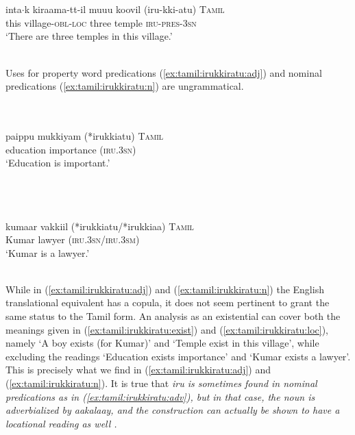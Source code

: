 \documentclass[a4paper,12pt]{article}
\newcommand{\xbox}[2]{\noindent\parbox[t]{#1}{#2}\noindent}
\newcommand{\xref}[1]{(\ref{#1})}
\newcommand{\ea}{\\\\}
\newcommand{\z}{\\\\}
\begin{document}
\xbox{\textwidth}{
\ea\label{ex:tamil:irukkiratu:loc}
\gll inta$\cdot$k\footnotemark{} kiraama-tt-il muu\textipa{\textsubbar{n}}\textipa{\textsubbar{r}}u koovil (iru-kki\textipa{\textsubbar{r}}-atu) \textsc{Tamil} \\
      this village-\textsc{obl}-\textsc{loc} three temple \textsc{iru}-\textsc{pres}-\textsc{3sn} \\
    `There are three temples in this village.' \citep[173]{Lehmann1989tamil}
\z
} 

Uses for property word predications \xref{ex:tamil:irukkiratu:adj} and nominal predications \xref{ex:tamil:irukkiratu:n} are  ungrammatical.


\xbox{\textwidth}{
\ea\label{ex:tamil:irukkiratu:adj}
\gll pa\dott ippu mukkiyam (*irukki\textipa{\textsubbar{r}}atu) \textsc{Tamil} \\
     education importance (\textsc{iru}.\textsc{3sn}) \\
    `Education is important.' \citep[172]{Lehmann1989tamil}
\z
} 


\xbox{\textwidth}{
\ea\label{ex:tamil:irukkiratu:n}
\gll kumaar vakkiil (*irukki\textipa{\textsubbar{r}}atu/*irukki\textipa{\textsubbar{r}}aa\textipa{\textsubbar{n}}) \textsc{Tamil} \\
      Kumar lawyer (\textsc{iru}.\textsc{3sn}/\textsc{iru}.\textsc{3sm})\\
    `Kumar is a lawyer.' \citep[171]{Lehmann1989tamil}
\z
} 

While in \xref{ex:tamil:irukkiratu:adj} and \xref{ex:tamil:irukkiratu:n}  the English translational equivalent has a copula, it does not seem pertinent to grant the same status to the Tamil form. An analysis as an existential can cover both the meanings given in \xref{ex:tamil:irukkiratu:exist} and \xref{ex:tamil:irukkiratu:loc}, namely `A boy exists (for Kumar)' and `Temple exist in this village', while excluding the readings `Education exists importance' and `Kumar exists a lawyer'. This is precisely what we find in \xref{ex:tamil:irukkiratu:adj} and \xref{ex:tamil:irukkiratu:n}. It is true that \em iru \em is sometimes found in nominal predications as in \xref{ex:tamil:irukkiratu:adv}, but in that case, the noun is adverbialized by \em aakalaay\em, and the construction can actually be shown to have a locational reading as well \citep[cf.][174]{Lehmann1989tamil}.
\end{document}
